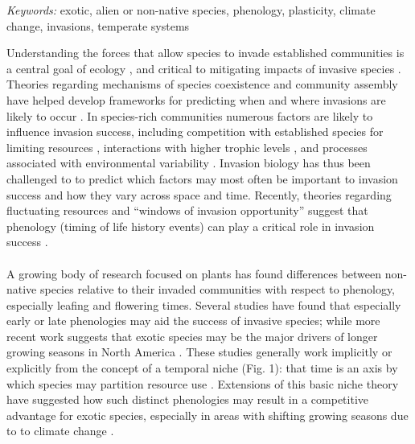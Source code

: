 \documentclass[11pt,a4paper,oneside]{article}
\begin{document}
\noindent \emph{Keywords:} exotic, alien or non-native species, phenology, plasticity, climate change, invasions, temperate systems

\newpage
\linenumbers
\noindent Understanding the forces that allow species to invade established communities is a central goal of ecology \citep{Elton:1958bk}, and critical to mitigating impacts of invasive species \citep{Levine:2003cn}. Theories regarding mechanisms of species coexistence and community assembly have helped develop frameworks for predicting when and where invasions are likely to occur \citep[e.g.,][]{Shea:2002pv}. In species-rich communities numerous factors are likely to influence invasion success, including competition with established species for limiting resources \citep{Macarthur:1970kp,tilman1982,tilman1988}, interactions with higher trophic levels \citep{Keane:2002uz,Colautti2004}, and processes associated with environmental variability \citep{chesson1981,chesson1986}. Invasion biology has thus been challenged to to predict which factors may most often be important to invasion success and how they vary across space and time. Recently, theories regarding fluctuating resources \citep{Davis:2000tg} and ``windows of invasion opportunity'' \citep{drake2006,caplat2010} suggest that phenology (timing of life history events) can play a critical role in invasion success \citep{wolkovich:2010fee}. \\
\\
A growing body of research focused on plants has found differences between non-native species relative to their invaded communities with respect to phenology, especially leafing and flowering times. Several studies have found that especially early \citep{mcewan2009,Wilsey:2011cr,throop2012,Wainwright:2012tw} or late \citep{Godoy:2009dz,Fridley:2012fj,paquette2012,Pearson:2012uq} phenologies may aid the success of invasive species; while more recent work suggests that exotic species may be the major drivers of longer growing seasons in North America \citep{wolkovichAmBot2013}. These studies generally work implicitly or explicitly from the concept of a temporal niche (Fig. 1): that time is an axis by which species may partition resource use \citep{gotelli1996}. Extensions of this basic niche theory have suggested how such distinct phenologies may result in a competitive advantage for exotic species, especially in areas with shifting growing seasons due to to climate change \citep{wolkovich:2010fee}.\\ 
\end{document}
